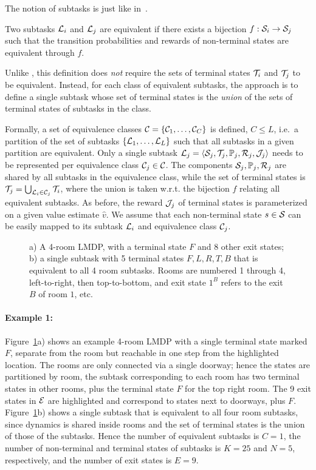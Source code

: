 The notion of subtasks is just like in~\citep{Wen2020}.
\begin{definition}
Two subtasks $\mathcal{L}_i$ and $\mathcal{L}_j$ are equivalent if there exists a bijection $f:\mathcal{S}_i\rightarrow\mathcal{S}_j$ such that the transition probabilities and rewards of non-terminal states are equivalent through $f$.
\end{definition}
Unlike \citep{Wen2020}, this definition does {\em not} require the sets of terminal states $\mathcal{T}_i$ and $\mathcal{T}_j$ to be equivalent. Instead, for each class of equivalent subtasks, the approach is to define a single subtask whose set of terminal states is the {\em union} of the sets of terminal states of subtasks in the class.

Formally, a set of equivalence classes $\mathcal{C}=\{\mathcal{C}_1,\ldots,\mathcal{C}_C\}$ is defined, $C\leq L$, i.e.~a partition of the set of subtasks $\{\mathcal{L}_1,\ldots,\mathcal{L}_L\}$ such that all subtasks in a given partition are equivalent. Only a single subtask $\mathcal{L}_j=\langle\mathcal{S}_j,\mathcal{T}_j,\mathbb{P}_j,\mathcal{R}_j,\mathcal{J}_j\rangle$ needs to be represented per equivalence class $\mathcal{C}_j\in\mathcal{C}$. The components $\mathcal{S}_j,\mathbb{P}_j,\mathcal{R}_j$ are shared by all subtasks in the equivalence class, while the set of terminal states is $\mathcal{T}_j=\bigcup_{\mathcal{L}_i\in\mathcal{C}_j} \mathcal{T}_i$, where the union is taken w.r.t. the bijection $f$ relating all equivalent subtasks. As before, the reward $\mathcal{J}_j$ of terminal states is parameterized on a given value estimate $\widehat{v}$. We assume that each non-terminal state $s\in\mathcal{S}$ can be easily mapped to its subtask $\mathcal{L}_i$ and equivalence class $\mathcal{C}_j$.


\begin{figure}[!t]
\begin{center}
    
\end{center}
\caption{a) A 4-room LMDP, with a terminal state $F$ and 8 other exit states; b) a single subtask with 5 terminal states $F,L,R,T,B$ that is equivalent to all 4 room subtasks. Rooms are numbered 1 through 4, left-to-right, then top-to-bottom, and exit state $1^B$ refers to the exit $B$ of room $1$, etc.}
\label{fig:ex}
\end{figure}


\paragraph{Example 1:} Figure~\ref{fig:ex}a) shows an example 4-room LMDP with a single terminal state marked $F$, separate from the room but reachable in one step from the highlighted location. The rooms are only connected via a single doorway; hence the states are partitioned by room, the subtask corresponding to each room has two terminal states in other rooms, plus the terminal state $F$ for the top right room. The 9 exit states in $\mathcal{E}$ are highlighted and correspond to states next to doorways, plus $F$. Figure~\ref{fig:ex}b) shows a single subtask that is equivalent to all four room subtasks, since dynamics is shared inside rooms and the set of terminal states is the union of those of the subtasks.
Hence the number of equivalent subtasks is $C=1$, the number of non-terminal and terminal states of subtasks is $K=25$ and $N=5$, respectively, and the number of exit states is $E=9$.

